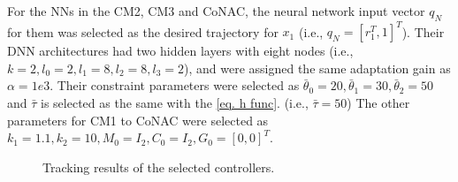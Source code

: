 \documentclass[lettersize,journal]{IEEEtran}
\begin{document}
For the NNs in the CM2, CM3 and CoNAC, the neural network input vector $q_N$ for them was selected as the desired trajectory for $x_1$ (i.e., $q_N=[r_1^T,1]^T$). 
Their DNN architectures had two hidden layers with eight nodes (i.e., $k=2, l_0=2, l_1=8, l_2=8, l_3=2$), and were assigned the same adaptation gain as $\alpha =1e3$.
Their constraint parameters were selected as $\bar\theta_0=20, \bar\theta_1=30, \bar\theta_2=50$ and $\bar\tau$ is selected as the same with the \eqref{eq. h func}. (i.e., $\bar\tau=50$)
The other parameters for CM1 to CoNAC were selected as $k_1=1.1,k_2=10,M_0=I_2,C_0=I_2,G_0=[0,0]^T$.

\begin{figure}[!t]
    \centering
    \qquad
    \vfill
    \qquad
    \caption{Tracking results of the selected controllers.}
    \label{fig: tracking}
\end{figure}
\end{document}
